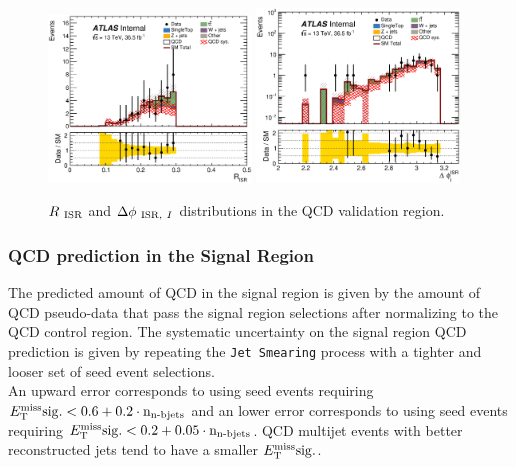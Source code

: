 \begin{figure}[!h]
\begin{center}
\includegraphics[width=0.48\textwidth]{figures/QCDJetSmearing/VRqC/RISR_36500} 
\includegraphics[width=0.48\textwidth]{figures/QCDJetSmearing/VRqC/dphiISRI_36500.eps}
\caption[$\RISR$ and $\dphiISRI$ distributions in the QCD validation regions]{$\RISR$ and $\dphiISRI$ distributions in the QCD validation region.}
\label{fig:QCD:VR}
\end{center}
\end{figure}

\subsubsection{QCD prediction in the Signal Region}

\indent The predicted amount of QCD in the signal region is given by the amount of QCD pseudo-data that pass the signal region selections after normalizing to the QCD control region. The systematic uncertainty on the signal region QCD prediction is given by repeating the {\tt Jet Smearing} process with a tighter and looser set of seed event selections.  \\

\indent An upward error corresponds to using seed events requiring $E_{\mathrm{T}}^{\mathrm{miss}}\rm{sig.} < 0.6 + 0.2\cdot n_{\textup{n-bjets}}$ and an lower error corresponds to using seed events requiring $E_{\mathrm{T}}^{\mathrm{miss}}\rm{sig.} < 0.2 + 0.05\cdot n_{\textup{n-bjets}}$. QCD multijet events with better reconstructed jets tend to have a smaller $E_{\mathrm{T}}^{\mathrm{miss}}\rm{sig.}$. \\

